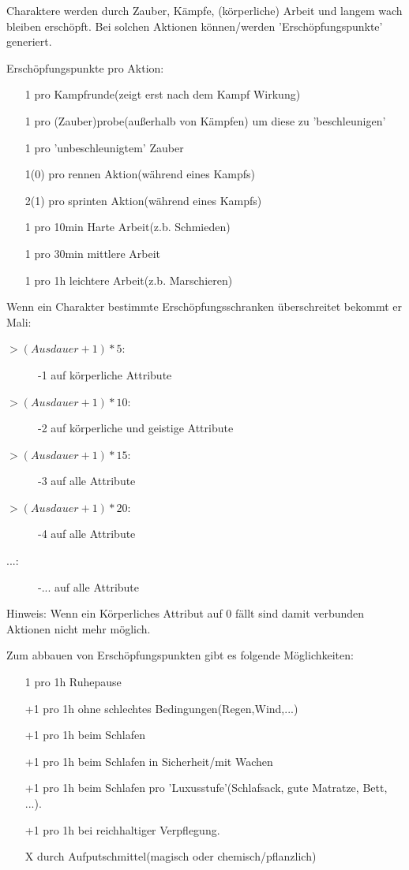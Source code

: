 Charaktere werden durch Zauber, Kämpfe, (körperliche) Arbeit und langem wach bleiben erschöpft. Bei solchen Aktionen können/werden 'Erschöpfungspunkte' generiert.

Erschöpfungspunkte pro Aktion:
\begin{itemize}
\item[1] pro Kampfrunde(zeigt erst nach dem Kampf Wirkung)
\item[1] pro (Zauber)probe(außerhalb von Kämpfen) um diese zu 'beschleunigen'
\item[1] pro 'unbeschleunigtem' Zauber
\item[1(0)] pro rennen Aktion(während eines Kampfs)
\item[2(1)] pro sprinten Aktion(während eines Kampfs)
\item[1] pro 10min Harte Arbeit(z.b. Schmieden)
\item[1] pro 30min mittlere Arbeit
\item[1] pro 1h leichtere Arbeit(z.b. Marschieren)
\end{itemize}

Wenn ein Charakter bestimmte Erschöpfungsschranken überschreitet bekommt er Mali:
\begin{description}
\item[$>(Ausdauer+1)*5$:] -1 auf körperliche Attribute
\item[$>(Ausdauer+1)*10$:] -2 auf körperliche und geistige Attribute
\item[$>(Ausdauer+1)*15$:] -3 auf alle Attribute
\item[$>(Ausdauer+1)*20$:] -4 auf alle Attribute
\item[...:] -... auf alle Attribute
\end{description}
Hinweis: Wenn ein Körperliches Attribut auf 0 fällt sind damit verbunden Aktionen nicht mehr möglich.

Zum abbauen von Erschöpfungspunkten gibt es folgende Möglichkeiten:
\begin{itemize}
\item[1] pro 1h Ruhepause
\item[+1] pro 1h ohne schlechtes Bedingungen(Regen,Wind,...)
\item[+1] pro 1h beim Schlafen
\item[+1] pro 1h beim Schlafen in Sicherheit/mit Wachen
\item[+1] pro 1h beim Schlafen pro 'Luxusstufe'(Schlafsack, gute Matratze, Bett, ...).
\item[+1] pro 1h bei reichhaltiger Verpflegung.
\item[X] durch Aufputschmittel(magisch oder chemisch/pflanzlich)
\end{itemize}

